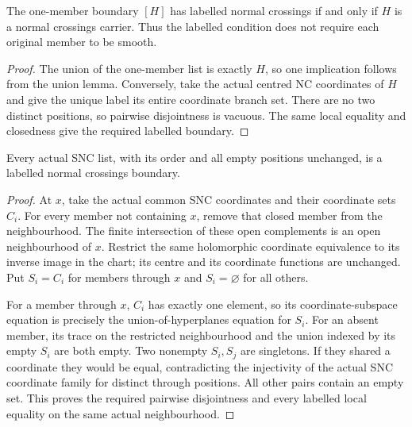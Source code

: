 \begin{lemma}
\label{hir:labelled-nc-singleton-equivalence}
\leanok
The one-member boundary $[H]$ has labelled normal crossings if and only
if $H$ is a normal crossings carrier. Thus the labelled condition does
not require each original member to be smooth.
\end{lemma}
\begin{proof}
The union of the one-member list is exactly $H$, so one implication
follows from the union lemma. Conversely, take the actual centred NC
coordinates of $H$ and give the unique label its entire coordinate
branch set. There are no two distinct positions, so pairwise
disjointness is vacuous. The same local equality and closedness give
the required labelled boundary.
\end{proof}

\begin{lemma}
\label{hir:snc-supplies-labelled-nc}
\leanok
Every actual SNC list, with its order and all empty positions unchanged,
is a labelled normal crossings boundary.
\end{lemma}
\begin{proof}
At $x$, take the actual common SNC coordinates and their coordinate
sets $C_i$. For every member not containing $x$, remove that closed
member from the neighbourhood. The finite intersection of these open
complements is an open neighbourhood of $x$. Restrict the same
holomorphic coordinate equivalence to its inverse image in the chart;
its centre and its coordinate functions are unchanged. Put $S_i=C_i$
for members through $x$ and $S_i=\varnothing$ for all others.

For a member through $x$, $C_i$ has exactly one element, so its
coordinate-subspace equation is precisely the union-of-hyperplanes
equation for $S_i$. For an absent member, its trace on the restricted
neighbourhood and the union indexed by its empty $S_i$ are both empty.
Two nonempty $S_i,S_j$ are singletons. If they shared a coordinate they
would be equal, contradicting the injectivity of the actual SNC
coordinate family for distinct through positions. All other pairs
contain an empty set. This proves the required pairwise disjointness
and every labelled local equality on the same actual neighbourhood.
\end{proof}


